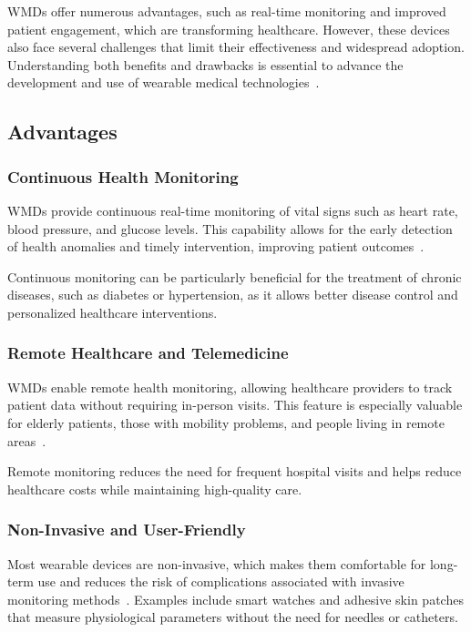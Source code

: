\documentclass[journal]{IEEEtran}
\begin{document}
WMDs offer numerous advantages, such as real-time monitoring and improved patient engagement, which are transforming healthcare. However, these devices also face several challenges that limit their effectiveness and widespread adoption. Understanding both benefits and drawbacks is essential to advance the development and use of wearable medical technologies~\cite{Dias2018,Iqbal2016,Ha2018}.

    \subsection{Advantages}

        \subsubsection{Continuous Health Monitoring}

        WMDs provide continuous real-time monitoring of vital signs such as heart rate, blood pressure, and glucose levels. This capability allows for the early detection of health anomalies and timely intervention, improving patient outcomes~\cite{Dias2018}.

        Continuous monitoring can be particularly beneficial for the treatment of chronic diseases, such as diabetes or hypertension, as it allows better disease control and personalized healthcare interventions.

        \subsubsection{Remote Healthcare and Telemedicine}

        WMDs enable remote health monitoring, allowing healthcare providers to track patient data without requiring in-person visits. This feature is especially valuable for elderly patients, those with mobility problems, and people living in remote areas~\cite{Nahavandi2022}.

        Remote monitoring reduces the need for frequent hospital visits and helps reduce healthcare costs while maintaining high-quality care.

        \subsubsection{Non-Invasive and User-Friendly}

        Most wearable devices are non-invasive, which makes them comfortable for long-term use and reduces the risk of complications associated with invasive monitoring methods~\cite{Iqbal2016}. Examples include smart watches and adhesive skin patches that measure physiological parameters without the need for needles or catheters.
\end{document}
